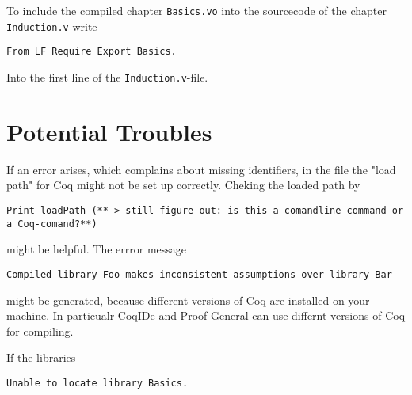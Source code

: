 To include the compiled chapter \texttt{Basics.vo} into the sourcecode of the chapter \texttt{Induction.v} write
\begin{lstlisting}
From LF Require Export Basics.
\end{lstlisting}
Into the first line of the \texttt{Induction.v}-file.

 

\section{Potential Troubles}

If an error arises, which complains about missing identifiers, in the file the "load path" for Coq might not be set up correctly.
Cheking the loaded path by
\begin{lstlisting}
Print loadPath (**-> still figure out: is this a comandline command or a Coq-comand?**) 
\end{lstlisting} 
might be helpful. The errror message
\begin{lstlisting}
Compiled library Foo makes inconsistent assumptions over library Bar
\end{lstlisting}
might be generated, because different versions of Coq are installed on your machine.
In particualr  CoqIDe and Proof General can use differnt versions of Coq for compiling.

If the libraries 
\begin{lstlisting}
Unable to locate library Basics.
\end{lstlisting}

 



 

 
